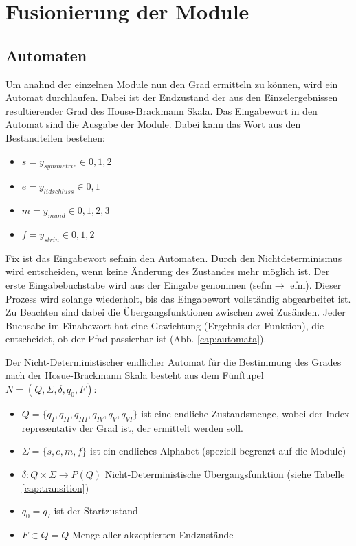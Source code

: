 \clearpage
\section{Fusionierung der Module}\label{fusion}

\subsection{Automaten}\label{automata}
Um anahnd der einzelnen Module nun den Grad ermitteln zu können, wird ein Automat durchlaufen. Dabei ist der Endzustand der aus den Einzelergebnissen resultierender Grad des House-Brackmann Skala. Das Eingabewort in den Automat sind die Ausgabe der Module. Dabei kann das Wort aus den Bestandteilen bestehen:

\begin{itemize}
\setlength\itemsep{-0.5em}
\item $s = y_{symmetrie}  \in  0, 1, 2 $
\item $e = y_{lidschluss} \in  0, 1 $
\item $m = y_{mund}       \in  0, 1, 2, 3 $
\item $f = y_{strin}      \in  0, 1, 2 $
\end{itemize}

Fix ist das Eingabewort \flqq sefm\frqq in den Automaten. Durch den Nichtdeterminismus wird  entscheiden, wenn keine Änderung des Zustandes mehr möglich ist. Der erste Eingabebuchstabe wird aus der Eingabe genommen (\flqq sefm\frqq $\rightarrow$ \flqq efm\frqq). Dieser Prozess wird solange wiederholt, bis das Eingabewort vollständig abgearbeitet ist. Zu Beachten sind dabei die Übergangsfunktionen zwischen zwei Zusänden. Jeder Buchsabe im Einabewort hat eine Gewichtung (Ergebnis der Funktion), die entscheidet, ob der Pfad passierbar ist (Abb. \ref{cap:automata}).

\vspace{0.5cm}

Der Nicht-Deterministischer endlicher Automat für die Bestimmung des Grades nach der Hosue-Brackmann Skala besteht aus dem Fünftupel $N = (Q, \Sigma, \delta, q_0, F)$:

\begin{itemize}
\item $Q=\{ q_I, q_{II}, q_{III}, q_{IV}, q_{V}, q_{VI} \}$  ist eine endliche Zustandsmenge, wobei der Index representativ der Grad ist, der ermittelt werden soll.
\item $\Sigma=\{ s, e, m, f \}$ ist ein endliches Alphabet (speziell begrenzt auf die Module)
\item $\delta:Q \times \Sigma \rightarrow P(Q)$ Nicht-Deterministische Übergangsfunktion (siehe Tabelle \ref{cap:transition})
\item $q_0=q_I$ ist der Startzustand
\item $F \subset Q = Q$ Menge aller akzeptierten Endzustände
\end{itemize}


